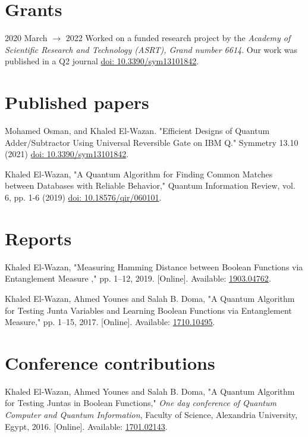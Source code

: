 \documentclass[margin,line]{resume}
\newcommand*{\doi}[1]{\href{http://dx.doi.org/#1}{doi: #1}}
\begin{document}
\begin{resume}
\begin{description}
    \end{description}

\section{\mysidestyle Grants}

    2020 March $\rightarrow$ 2022 Worked on a funded research project by the \textit{Academy of Scientific Research and Technology (ASRT), Grand number 6614}. Our work was published in a Q2 journal \doi{10.3390/sym13101842}.



\section{ \mysidestyle Published papers}

Mohamed Osman, and Khaled El-Wazan. "Efficient Designs of Quantum Adder/Subtractor Using Universal Reversible Gate on IBM Q." Symmetry 13.10 (2021) \doi{10.3390/sym13101842}.
    
    
Khaled El-Wazan, "A Quantum Algorithm for Finding Common Matches between Databases with Reliable Behavior," Quantum Information Review, vol. 6, pp. 1-6 (2019) \doi{10.18576/qir/060101}.


\section{\mysidestyle Reports}

Khaled El-Wazan, "Measuring Hamming Distance between Boolean Functions via Entanglement Measure ,"  pp. 1--12, 2019. 
[Online]. Available: \href{http://arxiv.org/abs/1903.04762}{1903.04762}.



Khaled El-Wazan, Ahmed Younes and Salah B. Doma, "A Quantum Algorithm for Testing Junta Variables and Learning Boolean Functions via Entanglement Measure,"  pp. 1--15, 2017. 
[Online]. Available: \href{http://arxiv.org/abs/1710.10495}{1710.10495}.



\section{ \mysidestyle Conference contributions}


Khaled El-Wazan, Ahmed Younes and Salah B. Doma, "A Quantum Algorithm for Testing Juntas in Boolean Functions," \textit{One day conference of Quantum Computer and Quantum Information}, Faculty of Science, Alexandria University, Egypt, 2016. [Online]. Available: \href{http://arxiv.org/abs/1701.02143}{1701.02143}.



\end{resume}
\end{document}
